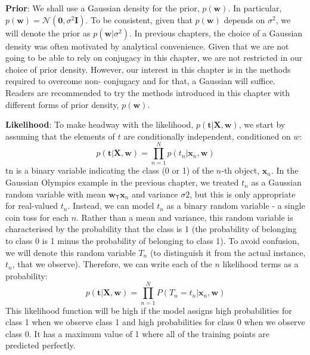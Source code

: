 \textbf{Prior}: We shall use a Gaussian density for the prior, $p(\mathbf{w})$.
In particular, $p(\mathbf{w}) = \mathcal{N}(\mathbf{0},\sigma^2 \mathbf{I})$.
To be consistent, given that $p(\mathbf{w})$ depends on $\sigma^2$, we will denote the
prior as $p(\mathbf{w}|\sigma^2)$. In previous chapters, the choice of a
Gaussian density was often
motivated by analytical convenience. Given that we are not going to be able to rely
on conjugacy in this chapter, we are not restricted in our choice of prior density.
However, our interest in this chapter is in the methods required to overcome non-
conjugacy and for that, a Gaussian will suffice. Readers are recommended to try the
methods introduced in this chapter with different forms of prior density, $p(\mathbf{w})$.

\textbf{Likelihood}: To make headway with the likelihood,
$p(\mathbf{t}|\mathbf{X},\mathbf{w})$, we start by assuming that the elements of
$t$ are conditionally independent, conditioned on $w$:
\begin{equation*}
p(\mathbf{t}|\mathbf{X},\mathbf{w}) =
\prod_{n=1}^{N} p(t_n | \mathbf{x}_n, \mathbf{w})
\end{equation*}
tn is a binary variable indicating the class (0 or 1) of the $n$-th object,
$\mathbf{x}_n$.
In the Gaussian Olympics example in the previous chapter, we treated $t_n$ as
a Gaussian random variable with mean $\mathbf{w}_{\mathsf{T}} \mathbf{x}_n$
and variance $\sigma2$, but this is only appropriate for
real-valued $t_n$.
Instead, we can model $t_n$ as a binary random variable - a single
coin toss for each $n$. Rather than a mean and variance, this random variable is
characterised by the probability that the class is 1 (the probability of belonging to
class 0 is 1 minus the probability of belonging to class 1). To avoid confusion, we will
denote this random variable $T_n$ (to distinguish it from the actual instance, $t_n$,
that we observe). Therefore, we can write each of the $n$ likelihood terms as a probability:
\begin{equation}
p(\mathbf{t}|\mathbf{X},\mathbf{w}) =
\prod_{n=1}^{N} P(T_{n}=t_{n} | \mathbf{x}_n, \mathbf{w})
\end{equation}
This likelihood function will be high if the model assigns high probabilities for class
1 when we observe class 1 and high probabilities for class 0 when we observe class 0.
It has a maximum value of 1 where all of the training points are predicted perfectly.

